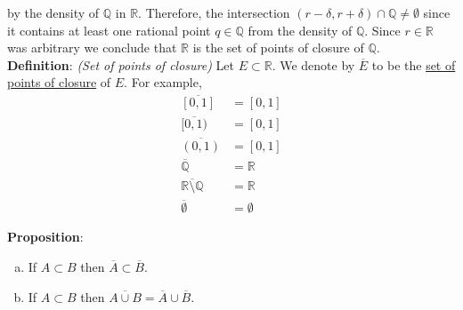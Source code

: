 \documentclass[12pt]{article}
\newcommand{\R}{\mathbb R}
\newcommand{\Q}{\mathbb Q}
\begin{document}
by the density of $\Q$ in $\R$. Therefore, the intersection $(r - \delta, r + \delta) \cap \Q \neq \emptyset$ since it contains at least one rational point $q \in \Q$ from the density of $\Q$. Since $r\in\R$ was arbitrary we conclude that $\R$ is the set of points of closure of $\Q$. \\

%
%
{\bf Definition}: {\em (Set of points of closure)} Let $E \subset \R$. We denote by $\overline{E}$ to be the \underline{set of points of closure} of $E$. For example,
\begin{align*}
	\overline{[0,1]} &= [0,1] \\
	\overline{[0,1)} &= [0,1] \\
	\overline{(0,1)} &= [0,1] \\
	\overline{\Q} &= \R \\
	\overline{\R\setminus\Q} &= \R \\
	\overline{\emptyset} &= \emptyset
\end{align*}

%
%
{\bf Proposition}: 
\begin{enumerate}[(a)]
	\item If $A \subset B$ then $\overline{A} \subset \overline{B}$.
 	\item If $A \subset B$ then $\overline{A\cup B} = \overline{A} \cup \overline{B}$.
\end{enumerate}
\end{document}
